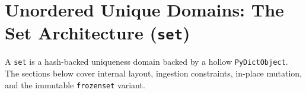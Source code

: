 \section{Unordered Unique Domains: The Set Architecture (\texttt{set})}

A \texttt{set} is a hash-backed uniqueness domain backed by a hollow \texttt{PyDictObject}. The sections below cover internal layout, ingestion constraints, in-place mutation, and the immutable \texttt{frozenset} variant.
